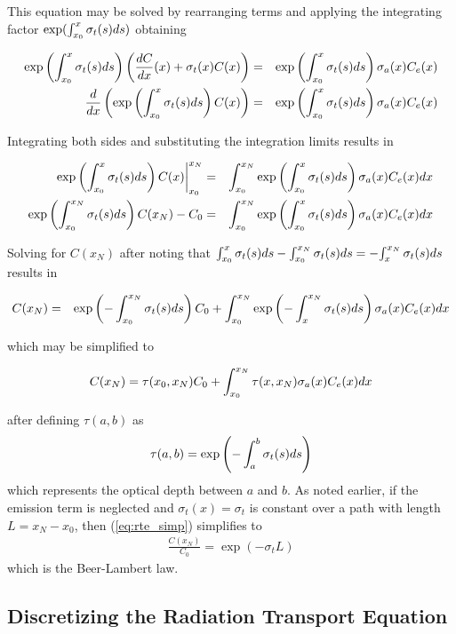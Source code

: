 This equation may be solved by rearranging terms and applying the integrating factor $\exp(\int_{x_0}^x \sigma_t(s) ds)$ obtaining

\begin{eqnarray*}
\exp\left({\int_{x_0}^{x} \sigma_t(s) ds}\right)\left(\frac{dC}{dx}(x)+\sigma_t(x) C(x)\right)&=&  \exp\left({\int_{x_0}^{x} \sigma_t(s) ds}\right)\sigma_a(x) C_e(x)\\
\frac{d}{dx}\left(\exp\left({\int_{x_0}^{x} \sigma_t(s) ds}\right) C(x)\right)&=& \exp\left({\int_{x_0}^{x} \sigma_t(s) ds}\right)\sigma_a(x) C_e(x)
\end{eqnarray*}

Integrating both sides and substituting the integration limits results in

\begin{eqnarray*}
\left.\exp\left({\int_{x_0}^{x} \sigma_t(s) ds}\right) C(x)\right|_{x_0}^{x_N}&=& \int_{x_0}^{x_N}\exp\left({\int_{x_0}^{x} \sigma_t(s) ds}\right)\sigma_a(x) C_e(x) dx \\
\exp\left({\int_{x_0}^{x_N} \sigma_t(s) ds}\right) C(x_N)-C_0&=& \int_{x_0}^{x_N}\exp\left({\int_{x_0}^{x} \sigma_t(s) ds}\right)\sigma_a(x) C_e(x) dx
\end{eqnarray*}

Solving for $C(x_N)$ after noting that ${\int_{x_0}^{x} \sigma_t(s) ds}-{\int_{x_0}^{x_N} \sigma_t(s) ds}=-{\int_{x}^{x_N} \sigma_t(s) ds}$ results in

\begin{eqnarray*}
C(x_N)&=&\exp\left({-\int_{x_0}^{x_N} \sigma_t(s) ds}\right) C_0+ \int_{x_0}^{x_N}\exp\left({-\int_{x}^{x_N} \sigma_t(s) ds}\right)\sigma_a(x) C_e(x) dx\\
\end{eqnarray*}

which may be simplified to

\begin{equation}
\label{eq:rte_simp}
\label{eq:rtesoln}
 C(x_N)=\tau(x_0,x_N)C_0 + \int_{x_0}^{x_N}\tau(x,x_N)\sigma_a(x)C_e(x) dx
\end{equation}

after defining $\tau(a,b)$ as
\begin{equation}
\label{eq:optdepth}
\tau(a,b)=\exp\left({-\int_{a}^{b} \sigma_t(s) ds}\right)
\end{equation}
which represents the optical depth between $a$ and $b$.  As noted earlier, if the emission term is neglected and $\sigma_t(x)=\sigma_t$ is constant over a path with length
$L=x_N-x_0$, then (\ref{eq:rte_simp}) simplifies to
\begin{eqnarray*}
 \frac{C(x_N)}{C_0}=\exp(-\sigma_tL)
\end{eqnarray*}
which is the Beer-Lambert law.


\subsection{Discretizing the Radiation Transport Equation}
\newcommand{\htau}[1]{\tau_{#1}^{N-1}}
\newcommand{\halpha}[1]{\alpha_{#1}^{N-1}}
\newcommand{\sigai}[1]{\sigma_{a,#1}}
\newcommand{\Lei}[1]{C_{e,#1}}
\newcommand{\Lhatj}[1]{C_{#1}^N}
\newcommand{\Lhatjj}[1]{\hat{C}_{#1}^N}
\newcommand{\Chatjj}[1]{\hat{C}_{#1}^N}
\newcommand{\Leii}[1]{\hat{C}_{e,#1}}

